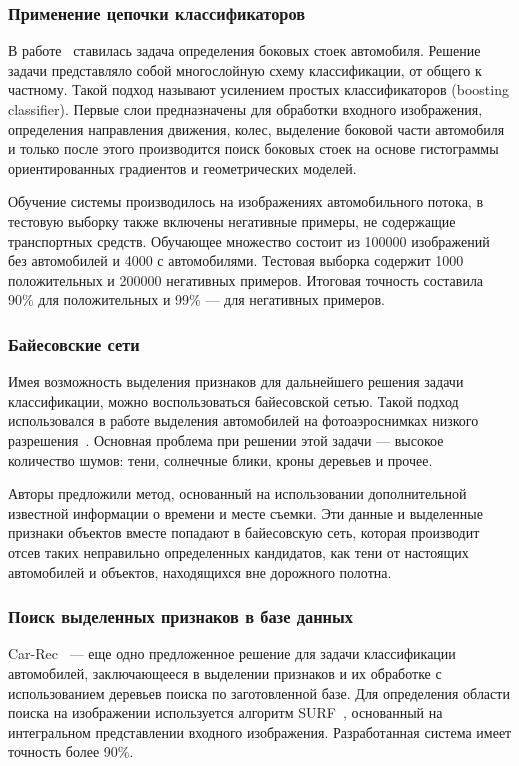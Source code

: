 \documentclass[a4paper,14pt]{extarticle} %
\begin{document}
\subsubsection{Применение цепочки классификаторов}
\hspace{\parindent} В работе~\cite{brehar2010pillars} ставилась задача определения боковых стоек автомобиля. Решение задачи представляло собой многослойную схему классификации, от общего к частному. Такой подход называют усилением простых классификаторов (boosting classifier). Первые слои предназначены для обработки входного изображения, определения направления движения, колес, выделение боковой части автомобиля и только после этого производится поиск боковых стоек на основе гистограммы ориентированных градиентов и геометрических моделей.

Обучение системы производилось на изображениях автомобильного потока, в тестовую выборку также включены негативные примеры, не содержащие транспортных средств. Обучающее множество состоит из 100000 изображений без автомобилей и 4000 с автомобилями. Тестовая выборка содержит 1000 положительных и 200000 негативных примеров. Итоговая точность составила 90\% для положительных и 99\% --- для негативных примеров.

\subsubsection{Байесовские сети} 
\hspace{\parindent} Имея возможность выделения признаков для дальнейшего решения задачи классификации, можно воспользоваться байесовской сетью. Такой подход использовался в работе выделения автомобилей на фотоаэроснимках низкого разрешения~\cite{zhao2003car}. Основная проблема при решении этой задачи --- высокое количество шумов: тени, солнечные блики, кроны деревьев и прочее.

Авторы предложили метод, основанный на использовании дополнительной известной информации о времени и месте съемки. Эти данные и выделенные признаки объектов вместе попадают в байесовскую сеть, которая производит отсев таких неправильно определенных кандидатов, как тени от настоящих автомобилей и объектов, находящихся вне дорожного полотна. 

\subsubsection{Поиск выделенных признаков в базе данных}
\hspace{\parindent} Car-Rec~\cite{jang2011car} --- еще одно предложенное решение для задачи классификации автомобилей, заключающееся в выделении признаков и их обработке с использованием деревьев поиска по заготовленной базе. Для определения области поиска на изображении используется алгоритм SURF~\cite{bay2008speeded}, основанный на интегральном представлении входного изображения. Разработанная система имеет точность более 90\%.
\end{document}
